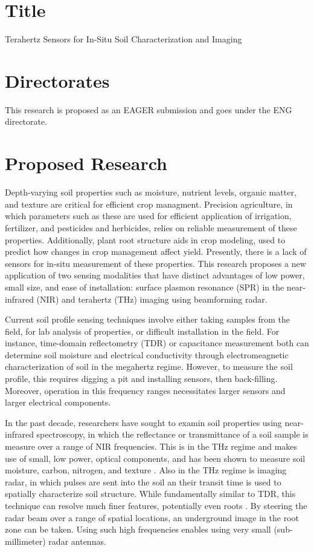 \documentclass[11pt,letterpaper]{article}
\begin{document}
\section{Title}
Terahertz Sensors for In-Situ Soil Characterization and Imaging
\section{Directorates}
This research is proposed as an EAGER submission and goes under the ENG directorate.
\section{Proposed Research}

Depth-varying soil properties such as moisture, nutrient levels, organic matter, and texture are critical for efficient crop managment. Precision agriculture, in which parameters such as these are used for efficient application of irrigation, fertilizer, and pesticides and herbicides, relies on reliable measurement of these properties.  Additionally, plant root structure aids in crop modeling, used to predict how changes in crop management affect yield. Presently, there is a lack of sensors for in-situ measurement of these properties. This research proposes a new application of two sensing modalities that have distinct advantages of low power, small size, and ease of installation: surface plasmon resonance (SPR) in the near-infrared (NIR) and terahertz (THz) imaging using beamforming radar.

Current soil profile sensing techniques involve either taking samples from the field, for lab analysis of properties, or difficult installation in the field. For instance, time-domain reflectometry (TDR) \cite{topp1980electromagnetic} or capacitance measurement \cite{birchak1974high} both can determine soil moisture and electrical conductivity through electromeagnetic characterization of soil in the megahertz regime. However, to measure the soil profile, this requires digging a pit and installing sensors, then back-filling. Moreover, operation in this frequency ranges necessitates larger sensors and larger electrical components.

In the past decade, researchers have sought to examin soil properties using near-infrared spectroscopy, in which the reflectance or transmittance of a soil sample is measure over a range of NIR frequencies. This is in the THz regime and makes use of small, low power, optical components, and has been shown to measure soil moisture, carbon, nitrogen, and texture \cite{chang2001near}. Also in the THz regime is imaging radar, in which pulses are sent into the soil an their transit time is used to spatially characterize soil structure. While fundamentally similar to TDR, this technique can resolve much finer features, potentially even roots \cite{dworak2011application}. By steering the radar beam over a range of spatial locations, an underground image in the root zone can be taken. Using such high frequencies enables using very small (sub-millimeter) radar antennas.
\end{document}
